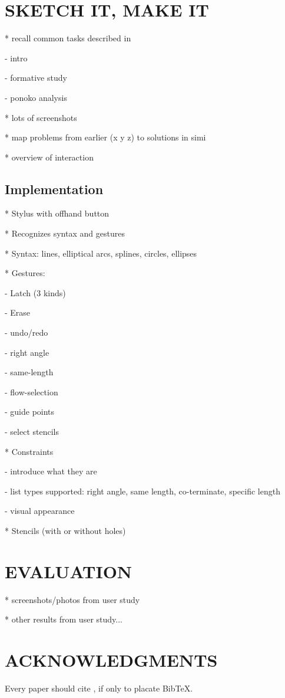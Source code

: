 \documentclass{article}
\begin{document}
\section{SKETCH IT, MAKE IT}

* recall common tasks described in

  - intro

  - formative study

  - ponoko analysis

* lots of screenshots

* map problems from earlier (x y z) to solutions in simi

* overview of interaction

\subsection{Implementation}

* Stylus with offhand button

* Recognizes syntax and gestures

* Syntax: lines, elliptical arcs, splines, circles, ellipses

* Gestures:

  - Latch (3 kinds) 

  - Erase 

  - undo/redo

  - right angle

  - same-length 

  - flow-selection

  - guide points

  - select stencils

* Constraints

  - introduce what they are

  - list types supported: right angle, same length, co-terminate, specific length

  - visual appearance

* Stencils (with or without holes)

\section{EVALUATION}

* screenshots/photos from user study

* other results from user study...

\section{ACKNOWLEDGMENTS}

Every paper should cite \cite{sutherland-sketchpad}, if only to placate BibTeX.



\end{document}

